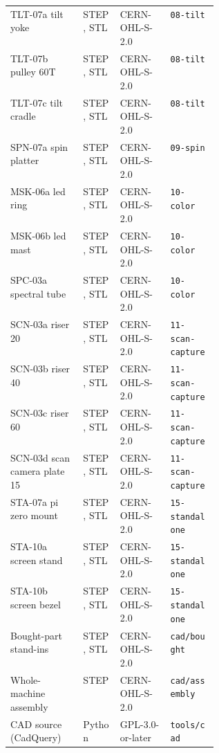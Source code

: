 \begin{tabular}{p{0.35\linewidth}lll}
TLT-07a tilt yoke & STEP, STL & CERN-OHL-S-2.0 & \texttt{08-tilt} \\
TLT-07b pulley 60T & STEP, STL & CERN-OHL-S-2.0 & \texttt{08-tilt} \\
TLT-07c tilt cradle & STEP, STL & CERN-OHL-S-2.0 & \texttt{08-tilt} \\
SPN-07a spin platter & STEP, STL & CERN-OHL-S-2.0 & \texttt{09-spin} \\
MSK-06a led ring & STEP, STL & CERN-OHL-S-2.0 & \texttt{10-color} \\
MSK-06b led mast & STEP, STL & CERN-OHL-S-2.0 & \texttt{10-color} \\
SPC-03a spectral tube & STEP, STL & CERN-OHL-S-2.0 & \texttt{10-color} \\
SCN-03a riser 20 & STEP, STL & CERN-OHL-S-2.0 & \texttt{11-scan-capture} \\
SCN-03b riser 40 & STEP, STL & CERN-OHL-S-2.0 & \texttt{11-scan-capture} \\
SCN-03c riser 60 & STEP, STL & CERN-OHL-S-2.0 & \texttt{11-scan-capture} \\
SCN-03d scan camera plate 15 & STEP, STL & CERN-OHL-S-2.0 & \texttt{11-scan-capture} \\
STA-07a pi zero mount & STEP, STL & CERN-OHL-S-2.0 & \texttt{15-standalone} \\
STA-10a screen stand & STEP, STL & CERN-OHL-S-2.0 & \texttt{15-standalone} \\
STA-10b screen bezel & STEP, STL & CERN-OHL-S-2.0 & \texttt{15-standalone} \\
Bought-part stand-ins & STEP, STL & CERN-OHL-S-2.0 & \texttt{cad/bought} \\
Whole-machine assembly & STEP & CERN-OHL-S-2.0 & \texttt{cad/assembly} \\
CAD source (CadQuery) & Python & GPL-3.0-or-later & \texttt{tools/cad} \\
\end{tabular}
